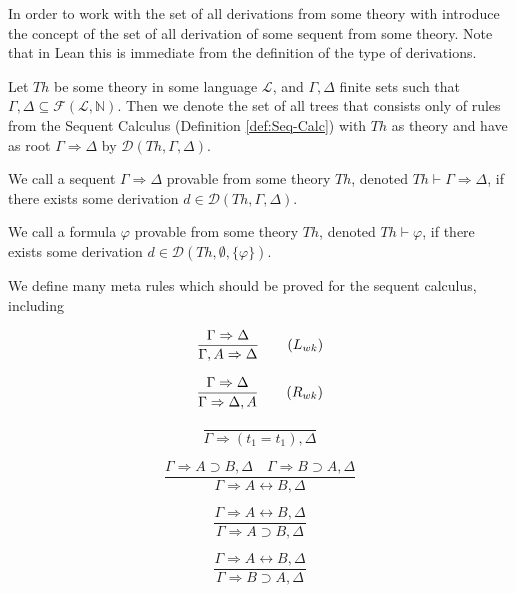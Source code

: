 In order to work with the set of all derivations from some theory with introduce the concept of the set of all derivation of some sequent from some theory. Note that in Lean this is immediate from the definition of the type of derivations.

\begin{definition}\label{def:Derivation}
\leanok
{}
Let $Th$ be some theory in some language $\mathcal{L}$, and $\Gamma, \Delta$ finite sets such that $\Gamma, \Delta \subseteq \mathcal{F}(\mathcal{L},\mathbb{N})$. Then we denote the set of all trees that consists only of rules from the Sequent Calculus (Definition \ref{def:Seq-Calc}) with $Th$ as theory and have as root $\Gamma \Rightarrow \Delta$ by $\mathcal{D}(Th,\Gamma,\Delta)$.
\end{definition}

\begin{definition}\label{def:Sequent-Provable}
\leanok
{}
We call a sequent $\Gamma \Rightarrow \Delta$ provable from some theory $Th$, denoted $Th \vdash \Gamma \Rightarrow \Delta$, if there exists some derivation $d \in \mathcal{D}(Th,\Gamma,\Delta)$.
\end{definition}

\begin{definition}\label{def:Formula-Provable}
\leanok
{}
We call a formula $\varphi$ provable from some theory $Th$, denoted $Th \vdash \varphi$, if there exists some derivation $d \in \mathcal{D}(Th,\emptyset,\{\varphi\})$.
\end{definition}

\begin{definition}[MetaRules]\label{def:MetaRules}
We define many meta rules which should be proved for the sequent calculus, including
\begin{multicols}{2}
\[
\frac{\Gamma \Rightarrow \Delta}{\Gamma, A \Rightarrow \Delta} \tag{$L_{wk}$}
\]

\[
\frac{\Gamma \Rightarrow \Delta}{\Gamma \Rightarrow \Delta, A} \tag{$R_{wk}$}
\]

\[
\frac{}{\Gamma \Rightarrow (t_1 = t_1), \Delta} \tag{$R=$}
\]

\[
\frac{\Gamma \Rightarrow A \supset B, \Delta \quad \Gamma \Rightarrow B \supset A, \Delta}{\Gamma \Rightarrow A \leftrightarrow B, \Delta} \tag{$R\leftrightarrow$}
\]

\[
\frac{\Gamma \Rightarrow A \leftrightarrow B, \Delta}{\Gamma \Rightarrow A \supset B, \Delta} \tag{$R \leftrightarrow elim\_to\_right$}
\]

\[
\frac{\Gamma \Rightarrow A \leftrightarrow B, \Delta}{\Gamma \Rightarrow B \supset A, \Delta} \tag{$R \leftrightarrow elim\_to\_left$}
\]
\end{multicols}
\end{definition}



